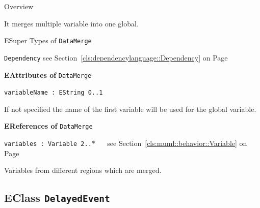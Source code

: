 	\begin{longdescription}
		\item[Overview] 		
				

	

		It merges multiple variable into one global.		
		\item[ESuper Types of \texttt{DataMerge}] ~
			\begin{longdescription}
				\item[\texttt{Dependency}] see Section~\ref{cls:dependencylanguage::Dependency} on Page~\pageref{cls:dependencylanguage::Dependency}						\end{longdescription}
		
	
			\item[\textbf{EAttributes of} \texttt{DataMerge}] ~
			\begin{longdescription}
	\item[\texttt{variableName : EString \symbol{"5B}0..1\symbol{"5D}
}] ~
	
	
	\nopagebreak
		
				

	

		If not specified the name of the first variable will be used for the global variable.		
			\end{longdescription}
			\item[\textbf{EReferences of} \texttt{DataMerge}] ~
			\begin{longdescription}
	\item[\texttt{variables : Variable \symbol{"5B}2..$*$\symbol{"5D}
}] ~
	see Section~\ref{cls:muml::behavior::Variable} on Page~\pageref{cls:muml::behavior::Variable}
	
	\nopagebreak
		
				

	

		 Variables from different regions which are merged.		
			\end{longdescription}
	
	\end{longdescription}
	

\subsection{EClass \bfseries \texttt{DelayedEvent}\normalfont}
\label{cls:dependencylanguage::DelayedEvent} 
	
